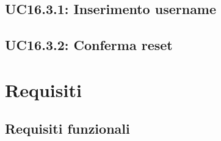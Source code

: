 \documentclass{scalatekids-article}
\begin{document}
\subsection{UC16.3.1: Inserimento username}

\subsection{UC16.3.2: Conferma reset}

\section{Requisiti}

\subsection{Requisiti funzionali}
\end{document}
